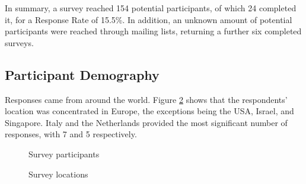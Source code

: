 In summary, a survey reached 154 potential participants, of which 24 completed it, for a Response Rate of 15.5\%.
In addition, an unknown amount of potential participants were reached through mailing lists, returning a further six completed surveys.

\subsection{Participant Demography}

Responses came from around the world.
Figure \ref{fig:Survey_locations} shows that the respondents' location was concentrated in Europe, the exceptions being the USA, Israel, and Singapore.
Italy and the Netherlands provided the most significant number of responses, with 7 and 5 respectively.

\begin{figure}
    \centering
    \caption{Survey participants}
    \label{fig:Survey_participants}
\end{figure}

\begin{figure}
    \centering
    \caption{Survey locations}
    \label{fig:Survey_locations}
\end{figure}

